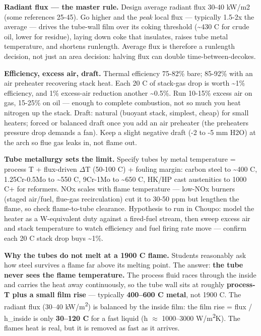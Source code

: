 \documentclass[11pt,a4paper]{article}
\begin{document}
\textbf{Radiant flux --- the master rule.} Design average radiant flux
30-40 kW/m2 (some references 25-45). Go higher and the \emph{peak} local
flux --- typically 1.5-2x the average --- drives the tube-wall film over
its coking threshold (\textasciitilde430 C for crude oil, lower for
residue), laying down coke that insulates, raises tube metal
temperature, and shortens runlength. Average flux is therefore a
runlength decision, not just an area decision: halving flux can double
time-between-decokes.

\textbf{Efficiency, excess air, draft.} Thermal efficiency 75-82\% bare;
85-92\% with an air preheater recovering stack heat. Each 20 C of
stack-gas drop is worth \textasciitilde1\% efficiency, and 1\%
excess-air reduction another \textasciitilde0.5\%. Run 10-15\% excess
air on gas, 15-25\% on oil --- enough to complete combustion, not so
much you heat nitrogen up the stack. Draft: natural (buoyant stack,
simplest, cheap) for small heaters; forced or balanced draft once you
add an air preheater (the preheater\textquotesingle s pressure drop
demands a fan). Keep a slight negative draft (-2 to -5 mm H2O) at the
arch so flue gas leaks in, not flame out.

\textbf{Tube metallurgy sets the limit.} Specify tubes by metal
temperature = process T + flux-driven \(\Delta\)T (50-100 C) + fouling margin:
carbon steel to \textasciitilde400 C, 1.25Cr-0.5Mo to \textasciitilde550
C, 9Cr-1Mo to \textasciitilde650 C, HK/HP cast austenitics to 1000 C+
for reformers. NOx scales with flame temperature --- low-NOx burners
(staged air/fuel, flue-gas recirculation) cut it to 30-50 ppm but
lengthen the flame, so check flame-to-tube clearance. Hypothesis to run
in Choupo: model the heater as a W-equivalent duty against a fired-fuel
stream, then sweep excess air and stack temperature to watch efficiency
and fuel firing rate move --- confirm each 20 C stack drop buys
\textasciitilde1\%.

\textbf{Why the tubes do not melt at a 1900 \textdegree{}C flame.} Students
reasonably ask how steel survives a flame far above its melting point.
The answer: \textbf{the tube never sees the flame temperature.} The
process fluid races through the inside and carries the heat away
continuously, so the tube wall sits at roughly \textbf{process-T plus a
small film rise} --- typically \textbf{400--600 \textdegree{}C metal}, not 1900 \textdegree{}C.
The radiant flux (30--40 kW/m\textsuperscript{2}) is balanced by the inside film: the film
rise = flux / h\_inside is only \textbf{30--120 \textdegree{}C} for a fast liquid (h
\(\approx\) 1000--3000 W/m\textsuperscript{2}K). The flame\textquotesingle s heat is real, but it is
removed as fast as it arrives.
\end{document}
